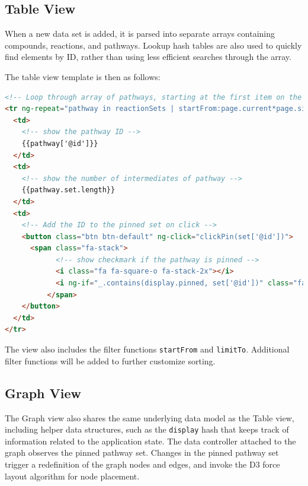 \subsection{Table View}
When a new data set is added, it is parsed into separate arrays containing compounds, reactions, and pathways.
Lookup hash tables are also used to quickly find elements by ID, rather than using less efficient searches through the array.

The table view template is then as follows:

\begin{lstlisting}[language=html]
<!-- Loop through array of pathways, starting at the first item on the page, stopping at the page size-->
<tr ng-repeat="pathway in reactionSets | startFrom:page.current*page.size | limitTo:page.size">
  <td>
    <!-- show the pathway ID -->
    {{pathway['@id']}}
  </td>
  <td>
    <!-- show the number of intermediates of pathway -->
    {{pathway.set.length}}
  </td>
  <td>
    <!-- Add the ID to the pinned set on click -->
    <button class="btn btn-default" ng-click="clickPin(set['@id'])">
      <span class="fa-stack">
            <!-- show checkmark if the pathway is pinned -->
            <i class="fa fa-square-o fa-stack-2x"></i>
            <i ng-if="_.contains(display.pinned, set['@id'])" class="fa fa-check fa-stack-1x"></i>
          </span>
    </button>
  </td>
</tr>
\end{lstlisting}

The view also includes the filter functions \texttt{startFrom} and \texttt{limitTo}. Additional filter functions will be added to further customize sorting.

\subsection{Graph View}
The Graph view also shares the same underlying data model as the Table view, including helper data structures, such as the \texttt{display} hash that keeps track of information related to the application state.
The data controller attached to the graph observes the pinned pathway set.
Changes in the pinned pathway set trigger a redefinition of the graph nodes and edges, and invoke the D3 force layout algorithm for node placement.

